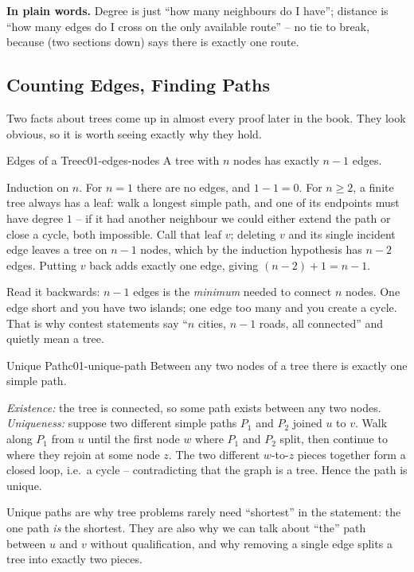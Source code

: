 \noindent\textbf{In plain words.} Degree is just ``how many neighbours do I have'';
distance is ``how many edges do I cross on the only available route'' -- no tie to break,
because  (two sections down) says there is exactly one route.

\subsection{Counting Edges, Finding Paths}

Two facts about trees come up in almost every proof later in the book. They look
obvious, so it is worth seeing exactly why they hold.

\begin{theorem}{Edges of a Tree}{c01-edges-nodes}
A tree with $n$ nodes has exactly $n-1$ edges.
\end{theorem}
\begin{proofbox}
Induction on $n$. For $n=1$ there are no edges, and $1-1=0$. For $n\ge 2$, a finite
tree always has a leaf: walk a longest simple path, and one of its endpoints must have
degree $1$ -- if it had another neighbour we could either extend the path or close a
cycle, both impossible. Call that leaf $v$; deleting $v$ and its single incident edge
leaves a tree on $n-1$ nodes, which by the induction hypothesis has $n-2$ edges. Putting
$v$ back adds exactly one edge, giving $(n-2)+1=n-1$.
\end{proofbox}
\begin{insightbox}
Read it backwards: $n-1$ edges is the \emph{minimum} needed to connect $n$ nodes. One
edge short and you have two islands; one edge too many and you create a cycle. That is
why contest statements say ``$n$ cities, $n-1$ roads, all connected'' and quietly mean a
tree.
\end{insightbox}

\begin{theorem}{Unique Path}{c01-unique-path}
Between any two nodes of a tree there is exactly one simple path.
\end{theorem}
\begin{proofbox}
\emph{Existence:} the tree is connected, so some path exists between any two nodes.
\emph{Uniqueness:} suppose two different simple paths $P_1$ and $P_2$ joined $u$ to
$v$. Walk along $P_1$ from $u$ until the first node $w$ where $P_1$ and $P_2$ split,
then continue to where they rejoin at some node $z$. The two different $w$-to-$z$
pieces together form a closed loop, i.e.\ a cycle -- contradicting that the graph is a
tree. Hence the path is unique.
\end{proofbox}
\begin{insightbox}
Unique paths are why tree problems rarely need ``shortest'' in the statement: the one
path \emph{is} the shortest. They are also why we can talk about ``the'' path between
$u$ and $v$ without qualification, and why removing a single edge splits a tree into
exactly two pieces.
\end{insightbox}

